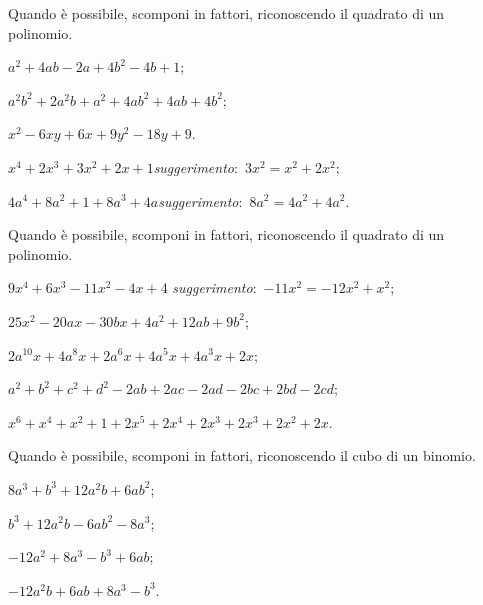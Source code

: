 \begin{esercizio}[\Ast]
\label{ese:13.36}
Quando è possibile, scomponi in fattori, riconoscendo il quadrato di un polinomio.
\begin{enumeratea}
 \item $a^{2}+4ab-2a+4b^{2}-4b+1$;
 \item $a^{2}b^{2}+2a^{2}b+a^{2}+4ab^{2}+4ab+4b^{2}$;
 \item $x^{2}-6xy+6x+9y^{2}-18y+9$.
 \item $x^{4}+2x^{3}+3x^{2}+2x+1$\quad  \emph{suggerimento}:~$3x^{2}=x^{2}+2x^{2}$;
 \item $4a^{4}+8a^{2}+1+8a^{3}+4a$\quad \emph{suggerimento}:~$8a^{2}=4a^{2}+4a^{2}$.
\end{enumeratea}
\end{esercizio}

\begin{esercizio}
\label{ese:13.37}
Quando è possibile, scomponi in fattori, riconoscendo il quadrato di un polinomio.
\begin{enumeratea}
 \item $9x^{4}+6x^{3}-11x^{2}-4x+4$ \quad \emph{suggerimento}:~$-11x^{2}=-12x^{2}+x^{2}$;
 \item $25x^{2}-20ax-30bx+4a^{2}+12ab+9b^{2}$;
 \item $2a^{10}x+4a^{8}x+2a^{6}x+4a^{5}x+4a^{3}x+2x$;
 \item $a^{2}+b^{2}+c^{2}+d^{2}-2ab+2ac-2ad-2bc+2bd-2cd$;
 \item $x^{6}+x^{4}+x^{2}+1+2x^{5}+2x^{4}+2x^{3}+2x^{3}+2x^{2}+2x$.
\end{enumeratea}
\end{esercizio}
\begin{esercizio}
\label{ese:13.38}
Quando è possibile, scomponi in fattori, riconoscendo il cubo di un binomio.
\begin{multicols}{2}
\begin{enumeratea}
 \item $8a^{3}+b^{3}+12a^{2}b+6ab^{2}$;
 \item $b^{3}+12a^{2}b-6ab^{2}-8a^{3}$;
 \item $-12a^{2}+8a^{3}-b^{3}+6ab$;
 \item $-12a^{2}b+6ab+8a^{3}-b^{3}$.
\end{enumeratea}
\end{multicols}
\end{esercizio}

